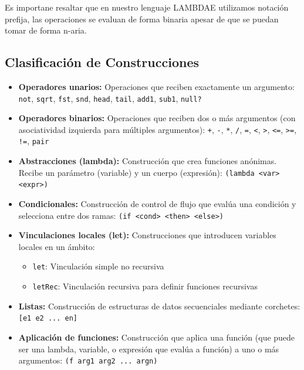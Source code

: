 \documentclass[a4paper,12pt]{article}
\begin{document}
Es importane resaltar que en nuestro lenguaje LAMBDAE utilizamos notación prefija, las operaciones se evaluan de forma binaria apesar de que se puedan tomar de forma n-aria.

\subsection*{Clasificación de Construcciones}

\begin{itemize}
    \item \textbf{Operadores unarios:} Operaciones que reciben exactamente 
    un argumento: \texttt{not}, \texttt{sqrt}, \texttt{fst}, \texttt{snd}, 
    \texttt{head}, \texttt{tail}, \texttt{add1}, \texttt{sub1}, \texttt{null?}
    
    \item \textbf{Operadores binarios:} Operaciones que reciben dos o más 
    argumentos (con asociatividad izquierda para múltiples argumentos): 
    \texttt{+}, \texttt{-}, \texttt{*}, \texttt{/}, \texttt{=}, \texttt{<}, 
    \texttt{>}, \texttt{<=}, \texttt{>=}, \texttt{!=}, \texttt{pair}
    
    \item \textbf{Abstracciones (lambda):} Construcción que crea funciones 
    anónimas. Recibe un parámetro (variable) y un cuerpo (expresión): 
    \texttt{(lambda <var> <expr>)}
    
    \item \textbf{Condicionales:} Construcción de control de flujo que evalúa 
    una condición y selecciona entre dos ramas: \texttt{(if <cond> <then> <else>)}
    
    \item \textbf{Vinculaciones locales (let):} Construcciones que introducen 
    variables locales en un ámbito:
    \begin{itemize}
        \item \texttt{let}: Vinculación simple no recursiva
        \item \texttt{letRec}: Vinculación recursiva para definir funciones recursivas
    \end{itemize}
    
    \item \textbf{Listas:} Construcción de estructuras de datos secuenciales 
    mediante corchetes: \texttt{[e1 e2 ... en]}
    
    \item \textbf{Aplicación de funciones:} Construcción que aplica una función 
    (que puede ser una lambda, variable, o expresión que evalúa a función) a 
    uno o más argumentos: \texttt{(f arg1 arg2 ... argn)}
\end{itemize}
\end{document}
